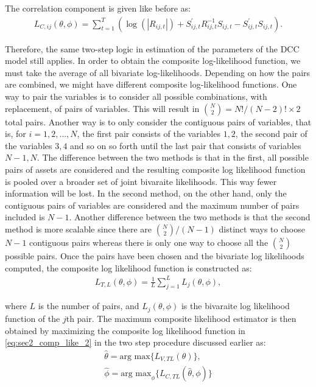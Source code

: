 The correlation component is given like before as:
\begin{align}
	L_{C,ij}(\theta, \phi) = \sum_{t=1}^T ( \operatorname{log}(|R_{ij,t}|) + S_{ij,t}^\prime R_{ij,t}^{-1}S_{ij,t} - S_{ij,t}^\prime S_{ij,t}). 
\end{align}

Therefore, the same two-step logic in estimation of the parameters of the DCC model still applies. In order to obtain the composite log-likelihood function, we must take the average of all bivariate log-likelihoods. Depending on how the pairs are combined, we might have different composite log-likelihood functions. One way to pair the variables is to consider all possible combinations, with replacement, of pairs of variables. This will result in $\binom{N}{2} = N!/(N-2)!\times 2$ total pairs. Another way is to only consider the contiguous pairs of variables, that is, for $i=1,2,\dots,N$, the first pair consists of the variables $1,2$, the second pair of the variables $3,4$ and so on so forth until the last pair that consists of variables $N-1,N$. The difference between the two methods is that in the first, all possible pairs of assets are considered and the resulting composite log likelihood function is pooled over a broader set of joint bivaraite likelihoods. This way fewer information will be lost. In the second method, on the other hand, only the contiguous pairs of variables are considered and the maximum number of pairs included is $N-1$. Another difference between the two methods is that the second method is more scalable since there are $\binom{N}{2}/(N-1)$ distinct ways to choose $N-1$ contiguous pairs whereas there is only one way to choose all the $\binom{N}{2}$ possible pairs. Once the pairs have been chosen and the bivariate log likelihoods computed, the composite log likelihood function is constructed as:
\begin{align}
	L_{T,L}(\theta, \phi) = \frac{1}{L} \sum_{j=1}^L L_{j}(\theta, \phi), \label{eq:sec2_comp_like_2}
\end{align}

where $L$ is the number of pairs, and $L_{j}(\theta, \phi)$ is the bivaraite log likelihood function of the $j$th pair. The maximum composite likelihood estimator is then obtained by maximizing the composite log likelihood function in \eqref{eq:sec2_comp_like_2} in the two step procedure discussed earlier as:
\begin{align}
	\hat{\theta} = \text{arg max}\{ L_{V,TL}(\theta) \}, \\
	\hat{\phi} = \text{arg max}_{\phi}\{ L_{C,TL}(\hat{\theta},\phi) \}
\end{align}



















